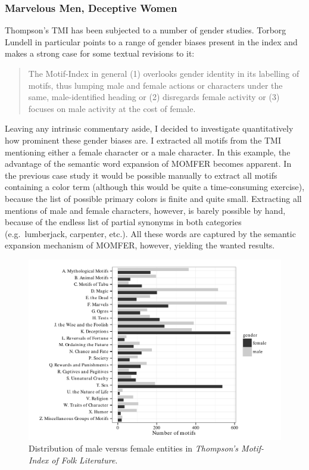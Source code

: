\subsubsection{Marvelous Men, Deceptive Women}

Thompson's TMI has been subjected to a number of gender studies. Torborg Lundell in particular points to a range of gender biases present in the index and makes a strong case for some textual revisions to it\autocites{lundell:1983,lundell:1989}[for a different view, see][83--85]{el-shamy:1990}:
\begin{quote}
    The Motif-Index in general (1) overlooks gender identity in its labelling of motifs, thus lumping male and female actions or characters under the same, male-identified heading or (2) disregards female activity or (3) focuses on male activity at the cost of female.\autocite[150]{lundell:1989}
\end{quote}
Leaving any intrinsic commentary aside, I decided to investigate quantitatively how prominent these gender biases are. I extracted all motifs from the TMI mentioning either a female character or a male character. In this example, the advantage of the semantic word expansion of MOMFER becomes apparent. In the previous case study it would be possible manually to extract all motifs containing a color term (although this would be quite a time-consuming exercise), because the list of possible primary colors is finite and quite small. Extracting all mentions of male and female characters, however, is barely possible by hand, because of the endless list of partial synonyms in both categories (e.g.\ lumberjack, carpenter, etc.). All these words are captured by the semantic expansion mechanism of MOMFER, however, yielding the wanted results.

\begin{figure}[t]
    \centering
    \includegraphics[width=\textwidth]{images/tmi-gender.pdf}
    \caption{Distribution of male versus female entities in \emph{Thompson's Motif-Index of Folk Literature}.}
    \label{fig:tmi-gender}
\end{figure}

